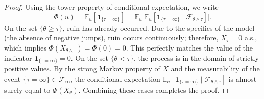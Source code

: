 \documentclass[10pt,a4paper]{amsart}
\begin{document}
\begin{proof}
Using the tower property of conditional expectation, we write
$$\Phi(u) = \mathbb{E}_u[\mathbf{1}_{\{\tau = \infty\}}] = \mathbb{E}_u \big[ \mathbb{E}_u[\mathbf{1}_{\{\tau = \infty\}} \mid \mathcal{F}_{\theta \wedge \tau}] \big].$$
On the set $\{\theta \ge \tau\}$, ruin has already occurred. Due to the specifics of the model (the absence of negative jumps), ruin occurs continuously; therefore, $X_\tau = 0$ a.s., which implies $\Phi(X_{\theta \wedge \tau}) = \Phi(0) = 0$. This perfectly matches the value of the indicator $\mathbf{1}_{\{\tau = \infty\}} = 0$.
On the set $\{\theta < \tau\}$, the process is in the domain of strictly positive values. By the strong Markov property of $X$ and the measurability of the event $\{\tau=\infty\} \in \mathcal{F}_\infty$, the conditional expectation $\mathbb{E}_u[\mathbf{1}_{\{\tau = \infty\}} \mid \mathcal{F}_{\theta \wedge \tau}]$ is almost surely equal to $\Phi(X_\theta)$. Combining these cases completes the proof.
\end{proof}
\end{document}
